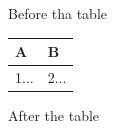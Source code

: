 \documentclass[11pt,a4paper]{article}
\begin{document}
Before tha table

\begin{table}[h]
\begin{tabular}{|l|l|}
\hline
A & B \\ \hline
1... & 2... \\ \hline
\end{tabular}
\end{table}

After the table
\end{document}
